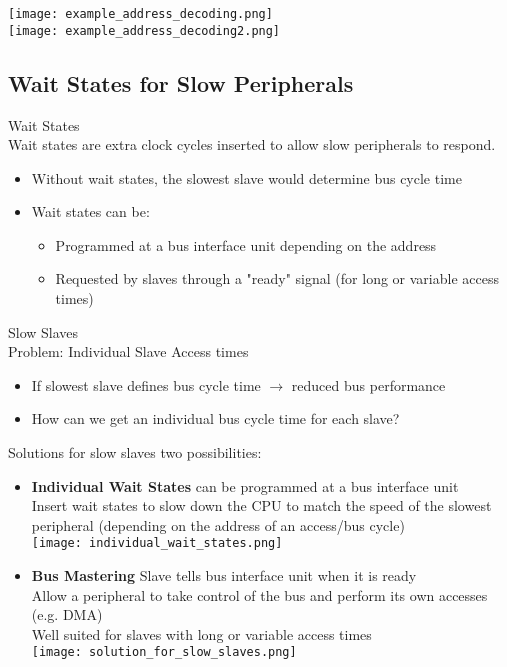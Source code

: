\begin{example}
    \texttt{[image: example\_address\_decoding.png]}\\
    \texttt{[image: example\_address\_decoding2.png]}
\end{example}

\subsection{Wait States for Slow Peripherals}

\begin{definition}{Wait States}\\
Wait states are extra clock cycles inserted to allow slow peripherals to respond.
\begin{itemize}
    \item Without wait states, the slowest slave would determine bus cycle time
    \item Wait states can be:
    \begin{itemize}
        \item Programmed at a bus interface unit depending on the address
        \item Requested by slaves through a "ready" signal (for long or variable access times)
    \end{itemize}
\end{itemize}
\end{definition}

\begin{definition}{Slow Slaves}\\
    Problem: Individual Slave Access times
    \begin{itemize}
        \item If slowest slave defines bus cycle time $\rightarrow$ reduced bus performance
        \item How can we get an individual bus cycle time for each slave?
    \end{itemize}   
\end{definition}

\begin{concept}{Solutions for slow slaves} two possibilities:
    \begin{itemize}
        \item \textbf{Individual Wait States} can be programmed at a bus interface unit \\
        Insert wait states to slow down the CPU to match the speed of the slowest peripheral (depending on the address of an access/bus cycle)\\
        \texttt{[image: individual\_wait\_states.png]}
        \item \textbf{Bus Mastering} Slave tells bus interface unit when it is ready \\
        Allow a peripheral to take control of the bus and perform its own accesses (e.g. DMA)\\
        Well suited for slaves with long or variable access times\\
        \texttt{[image: solution\_for\_slow\_slaves.png]}
    \end{itemize}
\end{concept}

